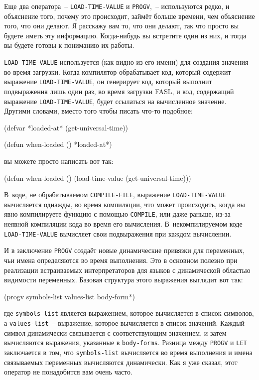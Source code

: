 Еще два оператора~-- \lstinline{LOAD-TIME-VALUE} и \lstinline{PROGV},~-- используются редко, и
объяснение того, почему это происходит, займёт больше времени, чем объяснение того, что
они делают. Я расскажу вам то, что они делают, так что просто вы будете иметь эту
информацию. Когда-нибудь вы встретите один из них, и тогда вы будете готовы к пониманию их
работы.

\lstinline{LOAD-TIME-VALUE} используется (как видно из его имени) для создания значения во
время загрузки.  Когда компилятор обрабатывает код, который содержит выражение
\lstinline{LOAD-TIME-VALUE}, он генерирует код, который выполнит подвыражения лишь один раз, во
время загрузки FASL, и код, содержащий выражение \lstinline{LOAD-TIME-VALUE}, будет ссылаться на
вычисленное значение.  Другими словами, вместо того чтобы писать что-то подобное:

\begin{myverb}
(defvar *loaded-at* (get-universal-time))

(defun when-loaded () *loaded-at*)
\end{myverb}

\noindent{}вы можете просто написать вот так:

\begin{myverb}
(defun when-loaded () (load-time-value (get-universal-time)))
\end{myverb}

В~коде, не обрабатываемом \lstinline{COMPILE-FILE}, выражение \lstinline{LOAD-TIME-VALUE}
вычисляется однажды, во время компиляции, что может происходить, когда вы явно компилируете
функцию с помощью \lstinline{COMPILE}, или даже раньше, из-за неявной компиляции кода во время
его вычисления.  В~некомпилируемом коде \lstinline{LOAD-TIME-VALUE} вычисляет свои
подвыражения при каждом вычислении.

И в заключение \lstinline{PROGV} создаёт новые динамические привязки для переменных, чьи имена
определяются во время выполнения.  Это в основном полезно при реализации встраиваемых
интерпретаторов для языков с динамической областью видимости переменных.  Базовая
структура этого выражения выглядит вот так:

\begin{myverb}
(progv symbols-list values-list
  body-form*)
\end{myverb}

\noindent{}где \lstinline{symbols-list} является выражением, которое вычисляется в список символов, а
\lstinline{values-list}~-- выражение, которое вычисляется в список значений.  Каждый символ
динамически связывается с соответствующим значением, и затем вычисляются выражения,
указанные в \lstinline{body-forms}.  Разница между \lstinline{PROGV} и \lstinline{LET} заключается в том,
что \lstinline{symbols-list} вычисляется во время выполнения и имена связываемых переменных
вычисляются динамически.  Как я уже сказал, этот оператор не понадобится вам очень часто.

